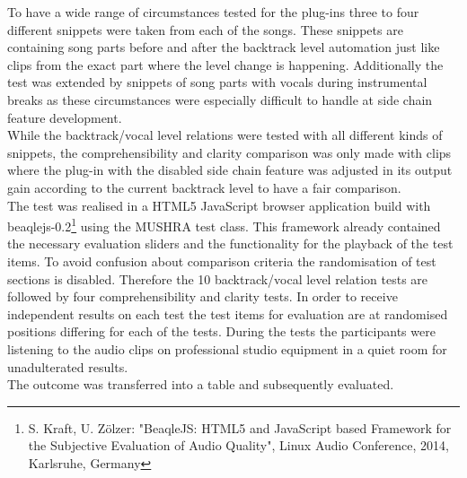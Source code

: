 To have a wide range of circumstances tested for the plug-ins three to four different snippets were taken from each of the songs. These snippets are containing song parts before and after the backtrack level automation just like clips from the exact part where the level change is happening. Additionally the test was extended by snippets of song parts with vocals during instrumental breaks as these circumstances were especially difficult to handle at side chain feature development.\\
While the backtrack/vocal level relations were tested with all different kinds of snippets, the comprehensibility and clarity comparison was only made with clips where the plug-in with the disabled side chain feature was adjusted in its output gain according to the current backtrack level to have a fair comparison.\\
The test was realised in a HTML5 JavaScript browser application build with beaqlejs-0.2\footnote{S. Kraft, U. Zölzer: "BeaqleJS: HTML5 and JavaScript based Framework for the Subjective Evaluation of Audio Quality", Linux Audio Conference, 2014, Karlsruhe, Germany} using the MUSHRA test class. This framework already contained the necessary evaluation sliders and the functionality for the playback of the test items. To avoid confusion about comparison criteria the randomisation of test sections is disabled. Therefore the 10 backtrack/vocal level relation tests are followed by four comprehensibility and clarity tests. In order to receive independent results on each test the test items for evaluation are at randomised positions differing for each of the tests. During the tests the participants were listening to the audio clips on professional studio equipment in a quiet room for unadulterated results.\\
The outcome was transferred into a table and subsequently evaluated.\\